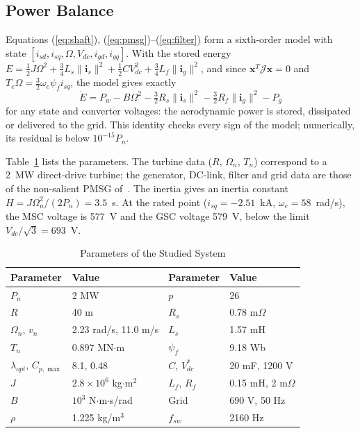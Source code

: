 \documentclass[conference]{IEEEtran}
\newcommand{\bv}[1]{\mathbf{#1}}
\newcommand{\Jm}{\boldsymbol{\mathcal{J}}}
\begin{document}
\subsection{Power Balance}
Equations (\ref{eq:shaft}), (\ref{eq:pmsg})--(\ref{eq:filter}) form a sixth-order model with state
$[i_{sd},i_{sq},\Omega,V_{dc},i_{gd},i_{gq}]$. With the stored energy
$E=\frac12J\Omega^2+\frac34L_s\|\bv{i}_s\|^2+\frac12CV_{dc}^2+\frac34L_f\|\bv{i}_g\|^2$, and since
$\bv{x}^T\Jm\bv{x}=0$ and $T_e\Omega=\frac32\omega_e\psi_fi_{sq}$, the model gives exactly
\begin{equation}
\dot E = P_w - B\Omega^2 - \tfrac32R_s\|\bv{i}_s\|^2 - \tfrac32R_f\|\bv{i}_g\|^2 - P_g
\label{eq:balance}
\end{equation}
for any state and converter voltages: the aerodynamic power is stored, dissipated or delivered to the
grid. This identity checks every sign of the model; numerically, its residual is below
$10^{-15}P_n$.

Table~\ref{tab:param} lists the parameters. The turbine data ($R$, $\Omega_n$, $T_n$) correspond to a
2~MW direct-drive turbine; the generator, DC-link, filter and grid data are those of the non-salient
PMSG of~\cite{hasan2021}. The inertia gives an inertia constant $H=J\Omega_n^2/(2P_n)=3.5$~s. At the
rated point ($i_{sq}=-2.51$~kA, $\omega_e=58$~rad/s), the MSC voltage is 577~V and the GSC voltage
579~V, below the limit $V_{dc}/\sqrt3=693$~V.

\begin{table}[t]
\caption{Parameters of the Studied System}
\label{tab:param}
\centering
\footnotesize
\setlength{\tabcolsep}{4pt}
\begin{tabular}{llll}
\toprule
Parameter & Value & Parameter & Value\\
\midrule
$P_n$ & 2 MW & $p$ & 26\\
$R$ & 40 m & $R_s$ & 0.78 m$\Omega$\\
$\Omega_n$, $v_n$ & 2.23 rad/s, 11.0 m/s & $L_s$ & 1.57 mH\\
$T_n$ & 0.897 MN$\cdot$m & $\psi_f$ & 9.18 Wb\\
$\lambda_{opt}$, $C_{p,\max}$ & 8.1, 0.48 & $C$, $V_{dc}^*$ & 20 mF, 1200 V\\
$J$ & $2.8\times10^6$ kg$\cdot$m$^2$ & $L_f$, $R_f$ & 0.15 mH, 2 m$\Omega$\\
$B$ & $10^3$ N$\cdot$m$\cdot$s/rad & Grid & 690 V, 50 Hz\\
$\rho$ & 1.225 kg/m$^3$ & $f_{sw}$ & 2160 Hz\\
\bottomrule
\end{tabular}
\end{table}
\end{document}
